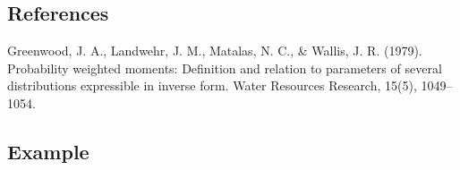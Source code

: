 \documentclass[a4paper,11pt,openany,english]{sphinxmanual}
\begin{document}
\begin{fulllineitems}
\begin{quote}
\begin{description}
\end{description}\end{quote}


\subsection{References}
\label{\detokenize{api_misc:references}}
\sphinxAtStartPar
Greenwood, J. A., Landwehr, J. M., Matalas, N. C., \& Wallis, J. R. (1979). Probability weighted moments: 
Definition and relation to parameters of several distributions expressible in inverse form. 
Water Resources Research, 15(5), 1049–1054. 


\subsection{Example}
\label{\detokenize{api_misc:id25}}
\begin{sphinxVerbatim}[commandchars=\\\{\}]
   
  \PYG{p}{[}    \PYG{p}{]}
\end{sphinxVerbatim}

\end{fulllineitems}

\end{document}
